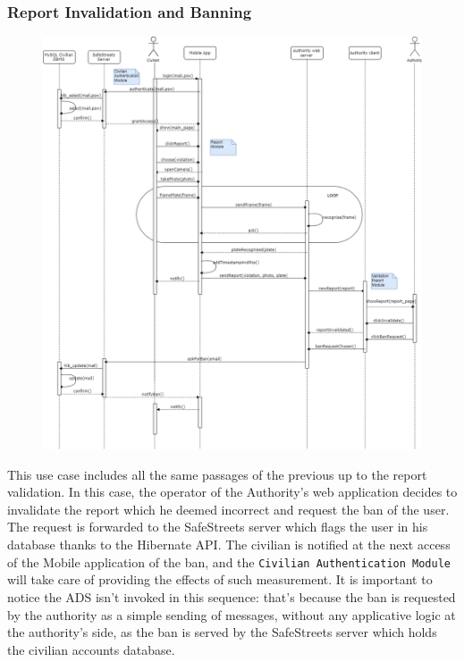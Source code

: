 \documentclass[12pt,a4paper]{article}
\begin{document}
\subsubsection{Report Invalidation and Banning}
\begin{figure}[H]
\begin{adjustwidth}{-25mm}{-25mm}
				\centering				
					        \includegraphics[width=0.75\paperwidth]{Images/invalidation_banning}
\end{adjustwidth}
\end{figure}
This use case includes all the same passages of the previous up to the report validation. In this case, the operator of the Authority's web application decides to invalidate the report which he deemed incorrect and request the ban of the user. The request is forwarded to the SafeStreets server which flags the user in his database thanks to the Hibernate API. The civilian is notified at the next access of the Mobile application of the ban, and the \texttt{Civilian Authentication Module} will take care of providing the effects of such measurement. It is important to notice the ADS isn't invoked in this sequence: that's because the ban is requested by the authority as a simple sending of messages, without any applicative logic at the authority's side, as the ban is served by the SafeStreets server which holds the civilian accounts database.
\end{document}
